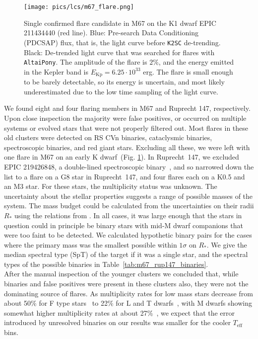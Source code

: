 \documentclass{aa}
\begin{document}
\begin{figure}[ht!]
    \centering
    \texttt{[image: pics/lcs/m67\_flare.png]}
    \caption{Single confirmed flare candidate in M67 on the K1 dwarf EPIC 211434440 (red line). Blue: Pre-search Data Conditioning (PDCSAP) flux, that is, the light curve before \texttt{K2SC} de-trending. Black: De-trended light curve that was searched for flares with \texttt{AltaiPony}. The amplitude of the flare is $2\%$, and the energy emitted in the Kepler band is $E_\mathrm{Kp}=6.25\cdot10^{33}$ erg. The flare is small enough to be barely detectable, so its energy is uncertain, and most likely underestimated due to the low time sampling of the light curve.}      
    \label{fig:m67}
\end{figure}
We found eight and four flaring members in M67 and Ruprecht 147, respectively. Upon close inspection the majority were false positives, or occurred on multiple systems or evolved stars that were not properly filtered out. Most flares in these old clusters were detected on RS CVn binaries, cataclysmic binaries, spectroscopic binaries, and red giant stars. Excluding all these, we were left with one flare in M67 on an early K dwarf~(Fig. \ref{fig:m67}). In Ruprecht~147, we excluded EPIC 219426848, a double-lined spectroscopic binary~\citep{curtis2013}, and so narrowed down the list to a flare on a G8 star in Ruprecht~147, and four flares each on a K0.5 and an M3 star. For these stars, the multiplicity status was unknown. The uncertainty about the stellar properties suggests a range of possible masses of the system. The mass budget could be calculated from the uncertainties on their radii $R_*$ using the relations from \citet{eker2018}. In all cases, it was large enough that the stars in question could in principle be binary stars with mid-M dwarf companions that were too faint to be detected. We calculated hypothetic binary pairs for the cases where the primary mass was the smallest possible within $1\sigma$ on $R_*$. We give the median spectral type (SpT) of the target if it was a single star, and the spectral types of the possible binaries in Table~\ref{tab:m67_rup147_binaries}.
\\
After the manual inspection of the younger clusters we concluded that, while binaries and false positives were present in these clusters also, they were not the dominating source of flares. As multiplicity rates for low mass stars decrease from about 50\% for F type stars~\citep{raghavan2010} to 22\% for L and T dwarfs~\citep{duchene2013}, with M dwarfs showing somewhat higher multiplicity rates at about 27\%~\citep{winters2019}, we expect that the error introduced by unresolved binaries on our results was smaller for the cooler $T_\mathrm{eff}$ bins.
\end{document}

